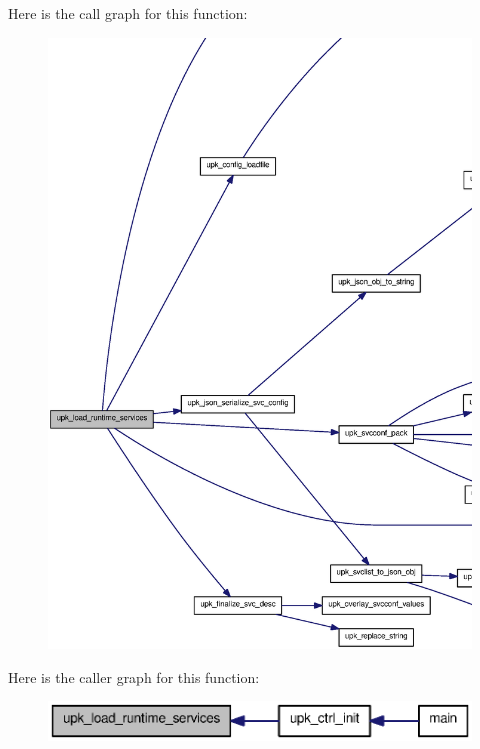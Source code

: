 Here is the call graph for this function:
\nopagebreak
\begin{figure}[H]
\begin{center}
\leavevmode
\includegraphics[width=400pt]{group__config__impl_gaad96df378fe382df9bb37e2f21b62ee9_cgraph}
\end{center}
\end{figure}




Here is the caller graph for this function:\nopagebreak
\begin{figure}[H]
\begin{center}
\leavevmode
\includegraphics[width=360pt]{group__config__impl_gaad96df378fe382df9bb37e2f21b62ee9_icgraph}
\end{center}
\end{figure}


